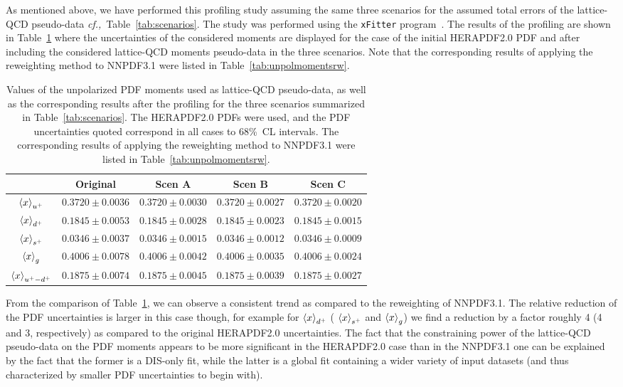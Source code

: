 As mentioned above, we have performed this profiling
study assuming the same three scenarios for the assumed
total errors of the lattice-QCD pseudo-data
{\it cf.,}~Table~\ref{tab:scenarios}.
%
The study was performed using the {\tt xFitter}
program~\cite{Alekhin:2014irh}.
%
The results of the profiling are shown in Table~\ref{tab:unpolmomentsProf} where the uncertainties
of the considered moments are displayed for the case of the initial HERAPDF2.0 PDF and after including the considered lattice-QCD
moments pseudo-data in the three scenarios.
%
Note that the
corresponding results of applying the reweighting method
to NNPDF3.1 were listed in Table~\ref{tab:unpolmomentsrw}.


\begin{table}[h]
  \centering
  \renewcommand{\arraystretch}{1.3} 
\begin{tabular}{c||c|c|c|c}
  \hline &  Original  & Scen A  &  Scen B  &  Scen C  \\
  \hline
  \hline
  $\left\langle x\right\rangle_{u^+}$     &  $0.3720\pm 0.0036$  &  $0.3720\pm 0.0030$  &  $0.3720\pm 0.0027$  &  $0.3720\pm 0.0020$ \\
  $\left\langle x\right\rangle_{d^+}$     &  $0.1845\pm 0.0053$  &  $0.1845\pm 0.0028$  &  $0.1845\pm 0.0023$  &  $0.1845\pm 0.0015$ \\
  $\left\langle x\right\rangle_{s^+}$     &  $0.0346\pm 0.0037$  &  $0.0346\pm 0.0015$  &  $0.0346\pm 0.0012$  &  $0.0346\pm 0.0009$ \\
  $\left\langle x\right\rangle_{g}$       &  $0.4006\pm 0.0078$  &  $0.4006\pm 0.0042$  &  $0.4006\pm 0.0035$  &  $0.4006\pm 0.0024$ \\
  $\left\langle x\right\rangle_{u^+-d^+}$ &  $0.1875\pm 0.0074$  &  $0.1875\pm 0.0045$  &  $0.1875\pm 0.0039$  &  $0.1875\pm 0.0027$ \\
  \hline
\end{tabular}
\caption{\small Values of the unpolarized PDF moments
  used as lattice-QCD pseudo-data, as well as the corresponding results
  after the profiling  for the
three scenarios summarized in Table~\ref{tab:scenarios}.
%
The HERAPDF2.0 PDFs were used, and the PDF uncertainties quoted correspond in all cases to 68\%~CL intervals.
%
The corresponding results of applying the reweighting method
to NNPDF3.1 were listed in Table~\ref{tab:unpolmomentsrw}.
\label{tab:unpolmomentsProf}
}
\end{table}

From the comparison of Table~\ref{tab:unpolmomentsProf},
we can observe a consistent trend as compared
to the reweighting of NNPDF3.1.
%
The relative reduction of the PDF uncertainties is larger
in this case though, for example for $\left\langle x\right\rangle_{d^+}$ ( $\left\langle x\right\rangle_{s^+}$
and  $\left\langle x\right\rangle_g$) we find a reduction by a factor roughly
4 (4 and 3, respectively) as compared to the original
HERAPDF2.0 uncertainties.
%
The fact that the constraining power of the lattice-QCD pseudo-data
on the PDF moments appears to be more significant in the
HERAPDF2.0 case than in the NNPDF3.1 one can be explained by the
fact that the former is a DIS-only fit, while the latter
is a global fit containing a wider variety of
input datasets (and thus characterized by smaller
PDF uncertainties to begin with).

